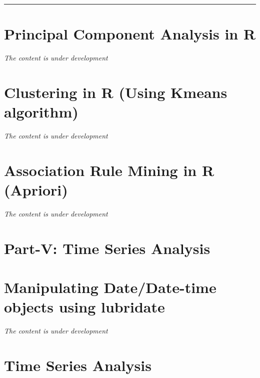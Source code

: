 \documentclass[
]{book}
\begin{document}
\begin{center}\rule{0.5\linewidth}{0.5pt}\end{center}

\hypertarget{principal-component-analysis-in-r}{%
\chapter{Principal Component Analysis in R}\label{principal-component-analysis-in-r}}

\emph{The content is under development}

\hypertarget{clustering-in-r-using-kmeans-algorithm}{%
\chapter{Clustering in R (Using Kmeans algorithm)}\label{clustering-in-r-using-kmeans-algorithm}}

\emph{The content is under development}

\hypertarget{association-rule-mining-in-r-apriori}{%
\chapter{Association Rule Mining in R (Apriori)}\label{association-rule-mining-in-r-apriori}}

\emph{The content is under development}

\hypertarget{part-v-time-series-analysis}{%
\chapter*{Part-V: Time Series Analysis}\label{part-v-time-series-analysis}}

\hypertarget{manipulating-datedate-time-objects-using-lubridate}{%
\chapter{Manipulating Date/Date-time objects using lubridate}\label{manipulating-datedate-time-objects-using-lubridate}}

\emph{The content is under development}

\hypertarget{time-series-analysis}{%
\chapter{Time Series Analysis}\label{time-series-analysis}}
\end{document}
